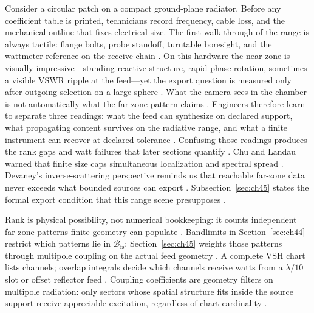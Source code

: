 \begin{physicalvignette}
Consider a circular patch on a compact ground-plane radiator. Before any coefficient table is printed, technicians record frequency, cable loss, and the mechanical outline that fixes electrical size. The first walk-through of the range is always tactile: flange bolts, probe standoff, turntable boresight, and the wattmeter reference on the receive chain \cite{hansen1988}.
On this hardware the near zone is visually impressive---standing reactive structure, rapid phase rotation, sometimes a visible VSWR ripple at the feed---yet the export question is measured only after outgoing selection on a large sphere \cite{harrington2001}. What the camera sees in the chamber is not automatically what the far-zone pattern claims \cite{stratton1941}.
Engineers therefore learn to separate three readings: what the feed can synthesize on declared support, what propagating content survives on the radiative range, and what a finite instrument can recover at declared tolerance \cite{devaney2004}. Confusing those readings produces the rank gaps and watt failures that later sections quantify \cite{pal2026}.
Chu and Landau warned that finite size caps simultaneous localization and spectral spread \cite{chu1948}. Devaney's inverse-scattering perspective reminds us that reachable far-zone data never exceeds what bounded sources can export \cite{devaney2004}.
Subsection~\ref{sec:ch45} states the formal export condition that this range scene presupposes \cite{stratton1941}.
\end{physicalvignette}
Rank is physical possibility, not numerical bookkeeping: it counts independent far-zone patterns finite geometry can populate \cite{harrington2001}. Bandlimits in Section~\ref{sec:ch44} restrict which patterns lie in $\mathcal{B}_{\mathrm{fs}}$; Section~\ref{sec:ch45} weights those patterns through multipole coupling on the actual feed geometry \cite{stratton1941}. A complete VSH chart lists channels; overlap integrals decide which channels receive watts from a $\lambda/10$ slot or offset reflector feed \cite{devaney2004}. Coupling coefficients are geometry filters on multipole radiation: only sectors whose spatial structure fits inside the source support receive appreciable excitation, regardless of chart cardinality \cite{stratton1941}.
